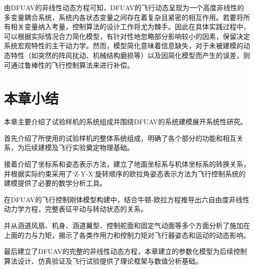 由DFUAV的非线性动态方程可知，DFUAV的飞行动态呈现为一个高度非线性的多变量耦合系统，系统内各状态变量之间存在着复杂且紧密的相互作用。若要将所有相关变量纳入考量，控制算法的设计工作将尤为棘手。因此在具体实践过程中，可以根据实际情况合力简化模型，有针对性地忽略部分影响较小的因素，保留决定系统宏观特性的主干动力学。然而，模型简化意味着信息缺失，对于未被建模的动态特性（如突然的阵风扰动、机械结构磨损等）以及因简化模型而产生的误差，则可通过鲁棒性的飞行控制算法来进行补偿。

\section{本章小结}

本章主要介绍了试验样机的系统组成并围绕DFUAV的系统建模展开系统性研究。

首先介绍了所使用的试验样机的整体系统组成，明确了各个部分的功能和相互关系，为后续建模及飞行实验奠定物理基础。

接着介绍了坐标系和姿态表示方法，建立了地面坐标系与机体坐标系的转换关系，并根据实际约束采用了‘Z-Y-X’旋转顺序的欧拉角姿态表示方法为飞行控制系统的建模提供了必要的数学分析工具。

在DFUAV的飞行控制刚体模型构建中，结合牛顿-欧拉方程推导出六自由度非线性动力学方程，完整表征平动与转动状态的关系。

并从涵道风扇、机身、涵道翼型、控制舵面和固定气动面等多个方面分析了施加在上面的力与力矩，揭示了各类作用力和控制力矩对飞行器姿态和运动的动态影响。

最后建立了DFUAV的完整的非线性动态方程，本章建立的参数化模型为后续控制算法设计、仿真验证及飞行试验提供了理论框架与数值分析基础。
